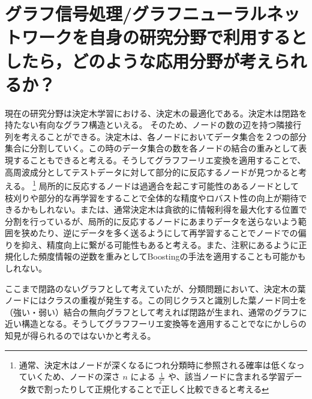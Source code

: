 \section{グラフ信号処理/グラフニューラルネットワークを自身の研究分野で利用するとしたら，どのような応用分野が考えられるか？}

現在の研究分野は決定木学習における、決定木の最適化である。決定木は閉路を持たない有向なグラフ構造といえる。
そのため、ノードの数の辺を持つ隣接行列を考えることができる。決定木は、各ノードにおいてデータ集合を２つの部分集合に分割していく。この時のデータ集合の数を各ノードの結合の重みとして表現することもできると考える。そうしてグラフフーリエ変換を適用することで、高周波成分としてテストデータに対して部分的に反応するノードが見つかると考える。
\footnote{
    通常、決定木はノードが深くなるにつれ分類時に参照される確率は低くなっていくため、ノードの深さ $n$ による $\frac{1}{2^n}$ や、該当ノードに含まれる学習データ数で割ったりして正規化することで正しく比較できると考える
}
局所的に反応するノードは過適合を起こす可能性のあるノードとして枝刈りや部分的な再学習をすることで全体的な精度やロバスト性の向上が期待できるかもしれない。または、通常決定木は貪欲的に情報利得を最大化する位置で分割を行っているが、局所的に反応するノードにあまりデータを送らないよう範囲を狭めたり、逆にデータを多く送るようにして再学習することでノードでの偏りを抑え、精度向上に繋がる可能性もあると考える。また、注釈にあるように正規化した頻度情報の逆数を重みとしてBoostingの手法を適用することも可能かもしれない。

ここまで閉路のないグラフとして考えていたが、分類問題において、決定木の葉ノードにはクラスの重複が発生する。この同じクラスと識別した葉ノード同士を（強い・弱い）結合の無向グラフとして考えれば閉路が生まれ、通常のグラフに近い構造となる。そうしてグラフフーリエ変換等を適用することでなにかしらの知見が得られるのではないかと考える。
